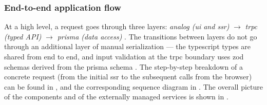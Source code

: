 \subsubsection{End-to-end application flow}\label{subsec:flux-capcoada}

At a high level, a request goes through three layers: \textit{\Gls{analog} (\acrshort{ui} and \acrshort{ssr})} \(\rightarrow\) \textit{\acrshort{trpc} (typed API)} \(\rightarrow\) \textit{\gls{prisma} (data access)} \cite{analog,trpc,prisma_orm}. The transitions between layers do not go through an additional layer of manual serialization --- the \gls{typescript} types are shared from end to end, and input validation at the \gls{trpc} boundary uses \gls{zod} schemas derived from the \gls{prisma} schema \cite{trpc,zod,prisma_zod_generator}. The step-by-step breakdown of a concrete request (from the initial \acrshort{ssr} to the subsequent calls from the browser) can be found in , and the corresponding sequence diagram in . The overall picture of the components and of the externally managed services is shown in .

